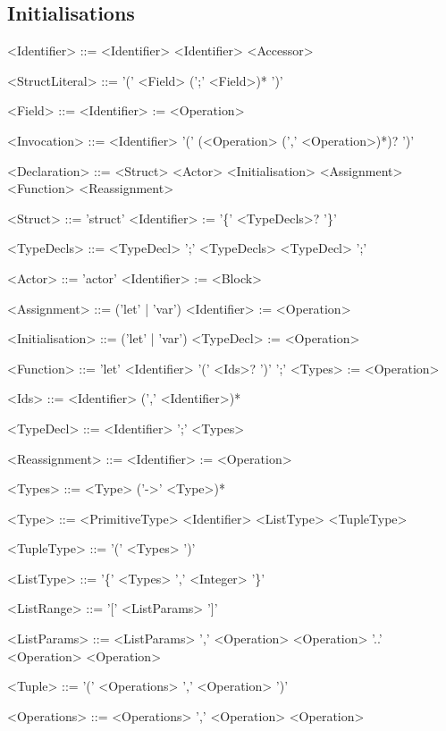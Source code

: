 \subsection{Initialisations}
\begin{grammar}
<Identifier> ::= <Identifier>
 \alt <Identifier> <Accessor>

<StructLiteral> ::= '(' <Field> (';' <Field>)* ')'

<Field> ::= <Identifier> := <Operation> 

<Invocation> ::= <Identifier> '(' (<Operation> (',' <Operation>)*)? ')'

<Declaration> ::= <Struct>
 \alt <Actor>
 \alt <Initialisation>
 \alt <Assignment>
 \alt <Function>
 \alt <Reassignment>

<Struct> ::= 'struct' <Identifier> := '\{' <TypeDecls>? '\}'

<TypeDecls> ::= <TypeDecl> ';' <TypeDecls>
 \alt <TypeDecl> ';'

<Actor> ::= 'actor' <Identifier> := <Block>

<Assignment> ::= ('let' | 'var') <Identifier> := <Operation>

<Initialisation> ::= ('let' | 'var') <TypeDecl> := <Operation>

<Function> ::= 'let' <Identifier> '(' <Ids>? ')' ';' <Types> := <Operation>

<Ids> ::= <Identifier> (',' <Identifier>)*

<TypeDecl> ::= <Identifier> ';' <Types>

<Reassignment> ::= <Identifier> := <Operation>

<Types> ::= <Type> ('->' <Type>)*

<Type> ::= <PrimitiveType>
 \alt <Identifier>
 \alt <ListType>
 \alt <TupleType>

<TupleType> ::= '(' <Types> ')'

<ListType> ::= '\{' <Types> ',' <Integer> '\}'

<ListRange> ::= '[' <ListParams> ']'

<ListParams> ::= <ListParams> ',' <Operation>
 \alt <Operation> '..' <Operation>
 \alt <Operation>

<Tuple> ::= '(' <Operations> ',' <Operation> ')'

<Operations> ::= <Operations> ',' <Operation>
 \alt <Operation>
\end{grammar}